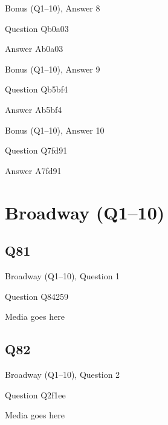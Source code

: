\documentclass[11pt]{beamer}
\begin{document}
\begin{frame}[t]{Bonus (Q1--10), Answer 8}
\vspace{2em}
\begin{block}{Question}
Qb0a03
\end{block}
\pause{}
\begin{block}{Answer}
Ab0a03
\end{block}
\end{frame}
    

\begin{frame}[t]{Bonus (Q1--10), Answer 9}
\vspace{2em}
\begin{block}{Question}
Qb5bf4
\end{block}
\pause{}
\begin{block}{Answer}
Ab5bf4
\end{block}
\end{frame}
    

\begin{frame}[t]{Bonus (Q1--10), Answer 10}
\vspace{2em}
\begin{block}{Question}
Q7fd91
\end{block}
\pause{}
\begin{block}{Answer}
A7fd91
\end{block}
\end{frame}
    

\section{Broadway (Q1--10)}
    

\subsection*{Q81}
\begin{frame}[t]{Broadway (Q1--10), Question 1}
\vspace{2em}
\begin{block}{Question}
Q84259
\end{block}
\begin{center}
Media goes here
\end{center}
\end{frame}
    

\subsection*{Q82}
\begin{frame}[t]{Broadway (Q1--10), Question 2}
\vspace{2em}
\begin{block}{Question}
Q2f1ee
\end{block}
\begin{center}
Media goes here
\end{center}
\end{frame}
    
\end{document}
